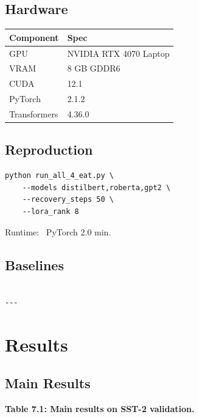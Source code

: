 \subsection{Hardware}

\begin{table}[H]
\centering
\small
\begin{tabular}{ll}
\toprule
\textbf{Component} & \textbf{Spec} \\
\midrule
GPU & NVIDIA RTX 4070 Laptop \\
VRAM & 8 GB GDDR6 \\
CUDA & 12.1 \\
PyTorch & 2.1.2 \\
Transformers & 4.36.0 \\
\bottomrule
\end{tabular}
\end{table}

\subsection{Reproduction}

\begin{lstlisting}
python run_all_4_eat.py \
    --models distilbert,roberta,gpt2 \
    --recovery_steps 50 \
    --lora_rank 8
\end{lstlisting}

Runtime: ~PyTorch 2.0 min.

\subsection{Baselines}

\begin{lstlisting}

---
\end{lstlisting}


\section{Results}

\subsection{Main Results}

\textbf{Table 7.1: Main results on SST-2 validation.}

